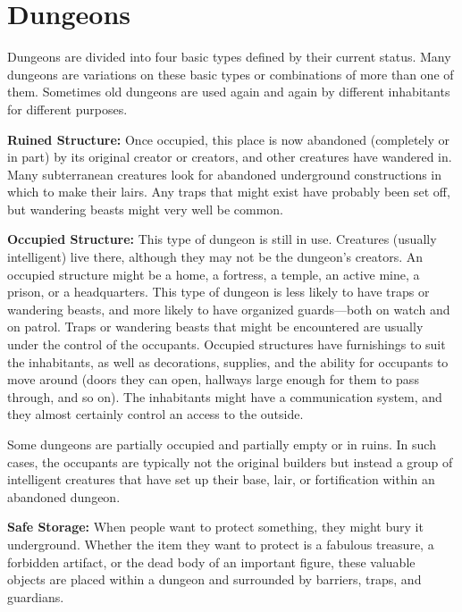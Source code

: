 \section{Dungeons}

Dungeons are divided into four basic types defined by their current status. Many dungeons are variations on these basic types or combinations of more than one of them. Sometimes old dungeons are used again and again by different inhabitants for different purposes.

\textbf{Ruined Structure:} Once occupied, this place is now abandoned (completely or in part) by its original creator or creators, and other creatures have wandered in. Many subterranean creatures look for abandoned underground constructions in which to make their lairs. Any traps that might exist have probably been set off, but wandering beasts might very well be common.

\textbf{Occupied Structure:} This type of dungeon is still in use. Creatures (usually intelligent) live there, although they may not be the dungeon's creators. An occupied structure might be a home, a fortress, a temple, an active mine, a prison, or a headquarters. This type of dungeon is less likely to have traps or wandering beasts, and more likely to have organized guards---both on watch and on patrol. Traps or wandering beasts that might be encountered are usually under the control of the occupants. Occupied structures have furnishings to suit the inhabitants, as well as decorations, supplies, and the ability for occupants to move around (doors they can open, hallways large enough for them to pass through, and so on). The inhabitants might have a communication system, and they almost certainly control an access to the outside.

Some dungeons are partially occupied and partially empty or in ruins. In such cases, the occupants are typically not the original builders but instead a group of intelligent creatures that have set up their base, lair, or fortification within an abandoned dungeon.

\textbf{Safe Storage:} When people want to protect something, they might bury it underground. Whether the item they want to protect is a fabulous treasure, a forbidden artifact, or the dead body of an important figure, these valuable objects are placed within a dungeon and surrounded by barriers, traps, and guardians.

